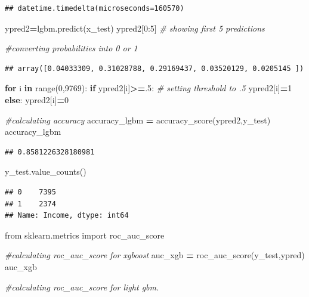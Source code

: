 \documentclass[
]{book}
\newenvironment{Shaded}{\begin{snugshade}}{\end{snugshade}}
\newcommand{\BuiltInTok}[1]{#1}
\newcommand{\CommentTok}[1]{\textcolor[rgb]{0.56,0.35,0.01}{\textit{#1}}}
\newcommand{\ControlFlowTok}[1]{\textcolor[rgb]{0.13,0.29,0.53}{\textbf{#1}}}
\newcommand{\DecValTok}[1]{\textcolor[rgb]{0.00,0.00,0.81}{#1}}
\newcommand{\FloatTok}[1]{\textcolor[rgb]{0.00,0.00,0.81}{#1}}
\newcommand{\ImportTok}[1]{#1}
\newcommand{\KeywordTok}[1]{\textcolor[rgb]{0.13,0.29,0.53}{\textbf{#1}}}
\newcommand{\NormalTok}[1]{#1}
\newcommand{\OperatorTok}[1]{\textcolor[rgb]{0.81,0.36,0.00}{\textbf{#1}}}
\begin{document}
\begin{verbatim}
## datetime.timedelta(microseconds=160570)
\end{verbatim}

\begin{Shaded}
\begin{Highlighting}[]
\NormalTok{ypred2}\OperatorTok{=}\NormalTok{lgbm.predict(x\_test)}
\NormalTok{ypred2[}\DecValTok{0}\NormalTok{:}\DecValTok{5}\NormalTok{]  }\CommentTok{\# showing first 5 predictions}

\CommentTok{\#converting probabilities into 0 or 1}
\end{Highlighting}
\end{Shaded}

\begin{verbatim}
## array([0.04033309, 0.31028788, 0.29169437, 0.03520129, 0.0205145 ])
\end{verbatim}

\begin{Shaded}
\begin{Highlighting}[]
\ControlFlowTok{for}\NormalTok{ i }\KeywordTok{in} \BuiltInTok{range}\NormalTok{(}\DecValTok{0}\NormalTok{,}\DecValTok{9769}\NormalTok{):}
    \ControlFlowTok{if}\NormalTok{ ypred2[i]}\OperatorTok{\textgreater{}=}\FloatTok{.5}\NormalTok{:       }\CommentTok{\# setting threshold to .5}
\NormalTok{       ypred2[i]}\OperatorTok{=}\DecValTok{1}
    \ControlFlowTok{else}\NormalTok{:  }
\NormalTok{       ypred2[i]}\OperatorTok{=}\DecValTok{0}

\CommentTok{\#calculating accuracy}
\NormalTok{accuracy\_lgbm }\OperatorTok{=}\NormalTok{ accuracy\_score(ypred2,y\_test)}
\NormalTok{accuracy\_lgbm}
\end{Highlighting}
\end{Shaded}

\begin{verbatim}
## 0.8581226328180981
\end{verbatim}

\begin{Shaded}
\begin{Highlighting}[]
\NormalTok{y\_test.value\_counts()}
\end{Highlighting}
\end{Shaded}

\begin{verbatim}
## 0    7395
## 1    2374
## Name: Income, dtype: int64
\end{verbatim}

\begin{Shaded}
\begin{Highlighting}[]
\ImportTok{from}\NormalTok{ sklearn.metrics }\ImportTok{import}\NormalTok{ roc\_auc\_score}

\CommentTok{\#calculating roc\_auc\_score for xgboost}
\NormalTok{auc\_xgb }\OperatorTok{=}\NormalTok{  roc\_auc\_score(y\_test,ypred)}
\NormalTok{auc\_xgb}



\CommentTok{\#calculating roc\_auc\_score for light gbm. }
\end{Highlighting}
\end{Shaded}
\end{document}
